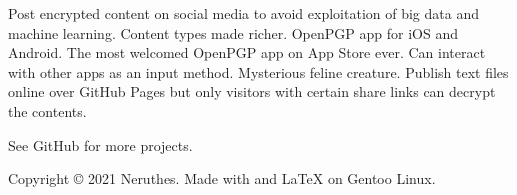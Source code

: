\hfill
\begin{minipage}[t]{15.5em}
	\raggedright


	{Post encrypted content on social media to avoid exploitation of big data and machine learning.
		Content types made richer.}
	{OpenPGP app for iOS and Android. The most welcomed OpenPGP app on App Store ever.
		Can interact with other apps as an input method.}
	{Mysterious feline creature.}
	{Publish text files online over GitHub Pages but only visitors with certain share links can decrypt the contents.}

	\vspace{25pt}

	\footnotesize
	See GitHub for more projects.
\end{minipage}






\vfill

\begin{minipage}[t]{\textwidth}
	\small

	Copyright {\copyright} 2021 Neruthes.
	Made with  and {\LaTeX} on Gentoo Linux.
\end{minipage}









